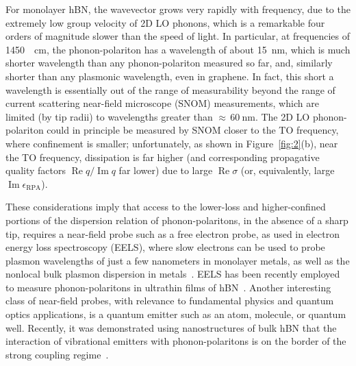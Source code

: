 \documentclass[aps,prb,twocolumn,
	           groupedaddress,superscriptaddress,
               amsfonts,amssymb,amsmath,floatfix,
	           citeautoscript]{revtex4-1}
\renewcommand{\Im}{\operatorname{Im}}
\renewcommand{\Re}{\operatorname{Re}}
\begin{document}
For monolayer hBN, the wavevector grows very rapidly with frequency, due to the extremely low group velocity of 2D LO phonons, which is a remarkable four orders of magnitude slower than the speed of light. In particular, at frequencies of \SI{1450}{\per\cm}, the phonon-polariton has a wavelength of about \SI{15}{\nm}, which is much shorter wavelength than any phonon-polariton measured so far, and, similarly shorter than any plasmonic wavelength, even in graphene. In fact, this short a wavelength is essentially out of the range of measurability beyond the range of current scattering near-field microscope (SNOM) measurements, which are limited (by tip radii) to wavelengths greater than ${\approx}\,\SI{60}{\nm}$. The 2D LO phonon-polariton could in principle be measured by SNOM closer to the TO frequency, where confinement is smaller; unfortunately, as shown in Figure~\ref{fig:2}(b), near the TO frequency, dissipation is far higher (and corresponding propagative quality factors $\Re q/\Im q$ far lower) due to large $\Re\sigma$ (or, equivalently, large $\Im\epsilon_{\mathrm{RPA}}$).

These considerations imply that access to the lower-loss and higher-confined portions of the dispersion relation of phonon-polaritons, in the absence of a sharp tip, requires a near-field probe such as a free electron probe, as used in electron energy loss spectroscopy (EELS), where slow electrons can be used to probe plasmon wavelengths of just a few nanometers in monolayer metals, as well as the nonlocal bulk plasmon dispersion in metals~\cite{nagao2001dispersion,de2010optical,diaconescu2007low}.
EELS has been recently employed to measure phonon-polaritons in ultrathin films of hBN~\cite{govyadinov2017probing}. Another interesting class of near-field probes, with relevance to fundamental physics and quantum optics applications, is a quantum emitter such as an atom, molecule, or quantum well. Recently, it was demonstrated using nanostructures of bulk hBN that the interaction of vibrational emitters with phonon-polaritons is on the border of the strong coupling regime~\cite{autore2018boron}.
\end{document}
